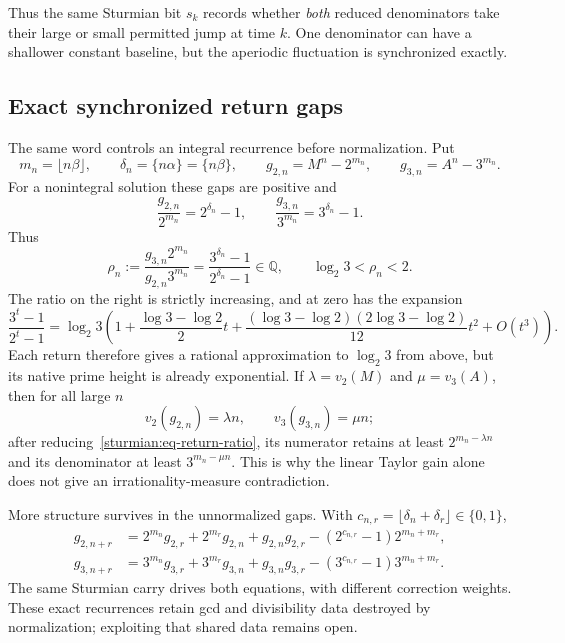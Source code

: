 \documentclass[11pt,oneside]{article}
\theoremstyle{definition}
\theoremstyle{remark}
\newcommand{\Q}{\mathbb Q}
\begin{document}
Thus the same Sturmian bit $s_k$ records whether \emph{both} reduced denominators take their
large or small permitted jump at time $k$.  One denominator can have a shallower constant
baseline, but the aperiodic fluctuation is synchronized exactly.

\subsection{Exact synchronized return gaps}
\label{sturmian:return-gaps}

The same word controls an integral recurrence before normalization.  Put
\[
 m_n=\lfloor n\beta\rfloor,\qquad \delta_n=\{n\alpha\}=\{n\beta\},\qquad
 g_{2,n}=M^n-2^{m_n},\qquad g_{3,n}=A^n-3^{m_n}.
\]
For a nonintegral solution these gaps are positive and
\begin{equation}
 \frac{g_{2,n}}{2^{m_n}}=2^{\delta_n}-1,\qquad
 \frac{g_{3,n}}{3^{m_n}}=3^{\delta_n}-1.
 \label{sturmian:eq-normalized-return-gaps}
\end{equation}
Thus
\begin{equation}
 \rho_n:=\frac{g_{3,n}2^{m_n}}{g_{2,n}3^{m_n}}
 =\frac{3^{\delta_n}-1}{2^{\delta_n}-1}\in\Q,
 \qquad \log_2 3<\rho_n<2.
 \label{sturmian:eq-return-ratio}
\end{equation}
The ratio on the right is strictly increasing, and at zero has the expansion
\[
 \frac{3^t-1}{2^t-1}
 =\log_2 3\left(1+\frac{\log3-\log2}{2}t
 +\frac{(\log3-\log2)(2\log3-\log2)}{12}t^2+O(t^3)\right).
\]
Each return therefore gives a rational approximation to $\log_2 3$ from above, but its
native prime height is already exponential.  If
$\lambda=v_2(M)$ and $\mu=v_3(A)$, then for all large $n$
\begin{equation}
 v_2(g_{2,n})=\lambda n,\qquad v_3(g_{3,n})=\mu n;
 \label{sturmian:eq-return-valuations}
\end{equation}
after reducing~\eqref{sturmian:eq-return-ratio}, its numerator retains at least
$2^{m_n-\lambda n}$ and its denominator at least $3^{m_n-\mu n}$.  This is why the
linear Taylor gain alone does not give an irrationality-measure contradiction.

More structure survives in the unnormalized gaps.  With
$c_{n,r}=\lfloor\delta_n+\delta_r\rfloor\in\{0,1\}$,
\begin{align}
 g_{2,n+r}&=2^{m_n}g_{2,r}+2^{m_r}g_{2,n}+g_{2,n}g_{2,r}
 -(2^{c_{n,r}}-1)2^{m_n+m_r},\\
 g_{3,n+r}&=3^{m_n}g_{3,r}+3^{m_r}g_{3,n}+g_{3,n}g_{3,r}
 -(3^{c_{n,r}}-1)3^{m_n+m_r}.
 \label{sturmian:eq-return-recurrences}
\end{align}
The same Sturmian carry drives both equations, with different correction weights.  These
exact recurrences retain gcd and divisibility data destroyed by normalization; exploiting
that shared data remains open.
\end{document}
